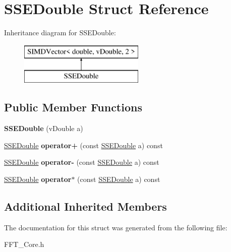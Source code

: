 \hypertarget{struct_s_s_e_double}{}\section{S\+S\+E\+Double Struct Reference}
\label{struct_s_s_e_double}
Inheritance diagram for S\+S\+E\+Double\+:\begin{figure}[H]
\begin{center}
\leavevmode
\includegraphics[height=2.000000cm]{struct_s_s_e_double}
\end{center}
\end{figure}
\subsection*{Public Member Functions}
\begin{DoxyCompactItemize}
\item 
\mbox{\label{struct_s_s_e_double_adaa321a0dc0944f8c0b48acac2a8e352}} 
{\bfseries S\+S\+E\+Double} (v\+Double a)
\item 
\mbox{\label{struct_s_s_e_double_ad2b19eb59d49103fb92d81b7d57fa262}} 
\hyperlink{struct_s_s_e_double}{S\+S\+E\+Double} {\bfseries operator+} (const \hyperlink{struct_s_s_e_double}{S\+S\+E\+Double} a) const
\item 
\mbox{\label{struct_s_s_e_double_a7fcd261ff47702f12f20d5aca3d911f6}} 
\hyperlink{struct_s_s_e_double}{S\+S\+E\+Double} {\bfseries operator-\/} (const \hyperlink{struct_s_s_e_double}{S\+S\+E\+Double} a) const
\item 
\mbox{\label{struct_s_s_e_double_aa5a92441965d9638594e8960ef3bf97b}} 
\hyperlink{struct_s_s_e_double}{S\+S\+E\+Double} {\bfseries operator$\ast$} (const \hyperlink{struct_s_s_e_double}{S\+S\+E\+Double} a) const
\end{DoxyCompactItemize}
\subsection*{Additional Inherited Members}


The documentation for this struct was generated from the following file\+:\begin{DoxyCompactItemize}
\item 
F\+F\+T\+\_\+\+Core.\+h\end{DoxyCompactItemize}

